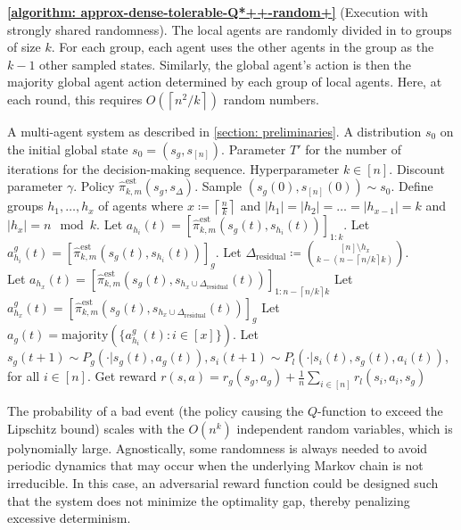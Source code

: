 \documentclass{article}
\theoremstyle{plain}
\theoremstyle{definition}
\def\ceil#1{\left\lceil #1 \right\rceil}
\def\est{\mathrm{est}}
\begin{document}
\textbf{\cref{algorithm: approx-dense-tolerable-Q*++-random+}} (Execution with strongly shared randomness).  The local agents are randomly divided in to groups of size $k$. For each group, each agent uses the other agents in the group as the $k-1$ other sampled states. Similarly, the global agent's action is then the majority global agent action determined by each group of local agents. Here, at each round, this requires $O(\ceil{n^2/k})$ random numbers.

\begin{algorithm}[t]
\caption{\texttt{SUB-SAMPLE-MFQ}: Execution with strongly shared randomness} \label{algorithm: approx-dense-tolerable-Q*++-random+}
\begin{algorithmic}[1]
\REQUIRE 
A multi-agent system as described in \cref{section: preliminaries}. A distribution $s_0$ on the initial global state $s_0 = (s_g, s_{{[n]}})$. Parameter $T'$ for the number of iterations for the decision-making sequence. Hyperparameter $k \in [n]$. Discount parameter $\gamma$. Policy $\hat{\pi}^\est_{k,m}(s_g, s_\Delta)$.
\STATE Sample $(s_g(0), s_{[n]}(0)) \sim s_0$.
\STATE Define groups $h_1, \dots, h_x$ of agents where $x\coloneq \ceil{\frac{n}{k}}$ and $|h_1|=|h_2|=\dots=|h_{x-1}|=k$ and $|h_x|=n\mod k$.
\STATE Let $a_{h_i}(t) = [\hat{\pi}_{k,m}^\est(s_g(t), s_{h_i}(t))]_{1:k}$.
\STATE Let $a^g_{h_i}(t) = [\hat{\pi}_{k,m}^\est(s_g(t), s_{h_i}(t))]_{g}$.
\ENDFOR
\STATE Let $\Delta_{\mathrm{residual}}\coloneq {[n]\setminus h_x \choose k - (n - \ceil{n/k}k)}$.\\
\STATE Let $a_{h_x}(t) = [\hat{\pi}_{k,m}^\est(s_g(t), s_{h_x\cup \Delta_{\mathrm{residual}}}(t))]_{1:n-\ceil{n/k}k}$
\STATE Let $a^g_{h_x}(t) = [\hat{\pi}_{k,m}^\est(s_g(t), s_{h_x\cup \Delta_{\mathrm{residual}}}(t))]_{g}$
\STATE Let $a_g(t) = \mathrm{majority}\left(\{a_{h_i}^g(t): i\in [x]\}\right)$.
\STATE Let $s_g(t+1) \sim P_g(\cdot|s_g(t), a_g(t)), s_i(t+1) \sim P_l(\cdot|s_i(t), s_g(t),a_i(t))$, for all $i\in [n]$.
\STATE Get reward $r(s,a) = r_g(s_g, a_g) + \frac{1}{n}\sum_{i\in[n]}r_l(s_i,a_i,s_g)$
\ENDFOR
\end{algorithmic}
\end{algorithm}

The probability of a bad event (the policy causing the $Q$-function to exceed the Lipschitz bound) scales with the $O(n^k)$ independent random variables, which is polynomially large. Agnostically, some randomness is always needed to avoid periodic dynamics that may occur when the underlying Markov chain is not irreducible. In this case, an adversarial reward function could be designed such that the system does not minimize the optimality gap, thereby penalizing excessive determinism.
\end{document}
